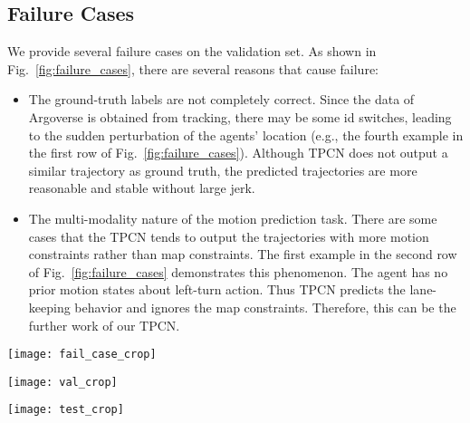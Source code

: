 \documentclass[final]{cvpr}
\begin{document}
\subsection{Failure Cases}
We provide several failure cases on the validation set. As shown in Fig.~\ref{fig:failure_cases}, there are several reasons that cause failure:
\begin{itemize}
    \item The ground-truth labels are not completely correct. Since the data of Argoverse is obtained from tracking, there may be some id switches, leading to the sudden perturbation of the agents' location (e.g., the fourth example in the first row of Fig.~\ref{fig:failure_cases}). Although TPCN does not output a similar trajectory as ground truth, the predicted trajectories are more reasonable and stable without large jerk.
    \item The multi-modality nature of the motion prediction task. There are some cases that the TPCN tends to output the trajectories with more motion constraints rather than map constraints. The first example in the second row of Fig.~\ref{fig:failure_cases} demonstrates this phenomenon. The agent has no prior motion states about left-turn action. Thus TPCN predicts the lane-keeping behavior and ignores the map constraints. Therefore, this can be the further work of our TPCN.
\end{itemize}

\begin{figure*}[t]
    \vspace{-5px}
    \centering
    \texttt{[image: fail\_case\_crop]}
    \caption{Failure cases on the Argoverse validation set. The target agent's past trajectory is in yellow, predicted trajectory in green and ground truth in red. }
    \label{fig:failure_cases}
    \vspace{-5px}
\end{figure*}

\begin{figure*}[t]
    \vspace{-5px}
    \centering
    \texttt{[image: val\_crop]}
    \caption{The motion forecasting results on the Argoverse validation set. The target agent's past trajectory is in yellow, predicted trajectory is in green, and ground truth is in red.}
    \label{fig:val_results}
    \vspace{-5px}
\end{figure*}

\begin{figure*}[t]
    \vspace{-5px}
    \centering
    \texttt{[image: test\_crop]}
    \caption{The motion forecasting results on the Argoverse test set. The target agent's past trajectory is in yellow and predicted trajectory in green.}
    \label{fig:test_results}
    \vspace{-5px}
\end{figure*}
\end{document}
